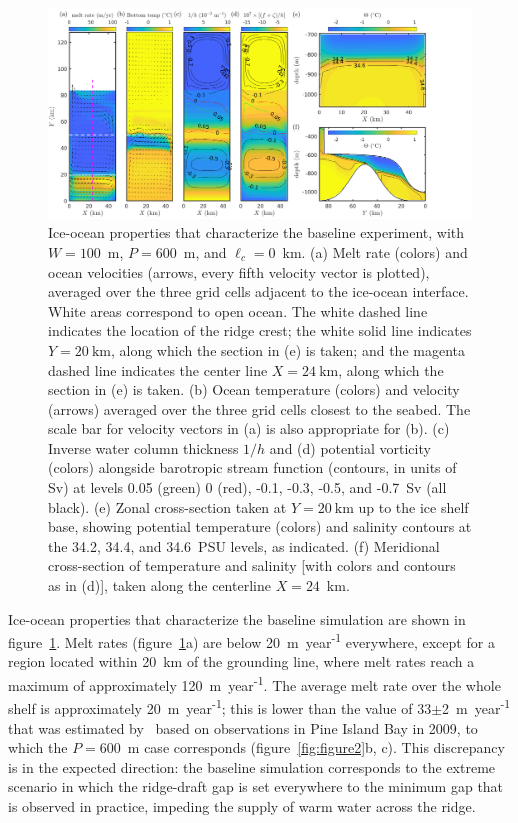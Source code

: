 \documentclass[draft]{agujournal2019}
\begin{document}
\begin{figure}
    \centering
    \includegraphics[width = \textwidth]{../make_figures/plots/figure3.png}
    \caption{Ice-ocean properties that characterize the baseline experiment, with $W = 100$~m, $P = 600$~m, and $\ell_c = 0$~km. (a) Melt rate (colors) and ocean velocities (arrows, every fifth velocity vector is plotted), averaged over the three grid cells adjacent to the ice-ocean interface. White areas correspond to open ocean. The white dashed line indicates the location of the ridge crest; the white solid line indicates $Y=20~\text{km}$, along which the section in (e) is taken; and the magenta dashed line indicates the center line $X = 24~\text{km}$, along which the section in (e) is taken. (b) Ocean temperature (colors) and velocity (arrows) averaged over the three grid cells closest to the seabed. The scale bar for velocity vectors in (a) is also appropriate for (b). (c) Inverse water column thickness $1/h$  and (d) potential vorticity (colors) alongside barotropic stream function (contours, in units of Sv) at levels 0.05 (green) 0 (red), -0.1, -0.3, -0.5, and -0.7~Sv (all black). (e) Zonal cross-section taken at $Y=20~\text{km}$ up to the ice shelf base, showing potential temperature (colors) and salinity contours at the 34.2, 34.4, and 34.6~PSU levels, as indicated. (f) Meridional cross-section of temperature and salinity [with colors and contours as in (d)], taken along the centerline $X = 24$~km.}
    \label{fig:figure3}
\end{figure}

Ice-ocean properties that characterize the baseline simulation are shown in figure~\ref{fig:figure3}. Melt rates (figure~\ref{fig:figure3}a) are below  20~m~year\textsuperscript{-1} everywhere, except for a region located within 20~km of the grounding line, where melt rates reach a maximum of approximately 120~m~year\textsuperscript{-1}. The average melt rate over the whole shelf is approximately 20~m~year\textsuperscript{-1}; this is lower than the value of 33$\pm$2~m~year\textsuperscript{-1} that was estimated by~ based on observations in Pine Island Bay in 2009, to which the $P=600$~m case corresponds (figure~\ref{fig:figure2}b, c). This discrepancy is in the expected direction: the baseline simulation corresponds to the extreme scenario in which the ridge-draft gap is set everywhere to the minimum gap that is observed in practice, impeding the supply of warm water across the ridge.
\end{document}
